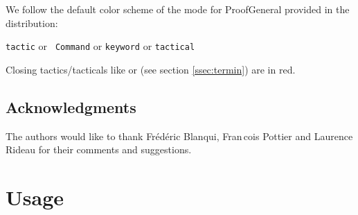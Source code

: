 \iffalse
\subsection*{How to read this documentation}

The syntax of the tactics is presented as follows:
\begin{itemize}
\item \ssrC{terminals} are in typewriter font and \ssrN{non terminals} are
  between angle brackets.
\item Optional parts of the grammar are surrounded by \optional{ }
  brackets. These should not be confused with verbatim brackets
  \ssrC{[ ]}, which are delimiters in the \ssr{} syntax.
\item A vertical rule {\optsep} indicates an alternative in the syntax, and
  should not be confused with a
  verbatim vertical rule between verbatim brackets \ssrC{[ | ]}.
\item A non empty list of non terminals (at least one item should be
  present) is represented by \ssrN{non terminals}$^+$. A possibly empty
  one is represented by \ssrN{non terminals}$^*$.
\item In a non empty list of non terminals, items are separated by blanks.
\end{itemize}
\fi

\ifhevea \else
\noindent We follow the default color scheme of the \ssr{} mode for
ProofGeneral provided in the distribution:

\centerline{
\textcolor{dkblue}{\texttt{tactic}} or \textcolor{dkviolet}{\tt
  Command} or \textcolor{dkgreen}{\tt keyword} or
\textcolor{dkpink}{\tt tactical}}

\noindent Closing tactics/tacticals like  or  (see section
\ref{ssec:termin}) are in red.
\fi

\subsection*{Acknowledgments}
The authors would like to thank Fr\'ed\'eric Blanqui, Fran\,cois Pottier
and Laurence Rideau for their comments and suggestions.

\newpage\section{Usage}

